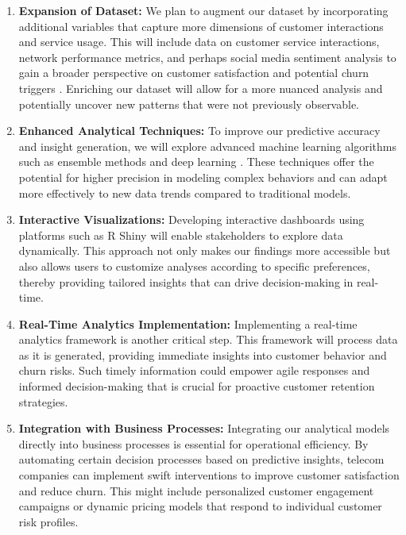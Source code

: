 \documentclass[12pt]{article}
\begin{document}
\begin{enumerate}
    \item \textbf{Expansion of Dataset:} We plan to augment our dataset by incorporating additional variables that capture more dimensions of customer interactions and service usage. This will include data on customer service interactions, network performance metrics, and perhaps social media sentiment analysis to gain a broader perspective on customer satisfaction and potential churn triggers \cite{han2011}. Enriching our dataset will allow for a more nuanced analysis and potentially uncover new patterns that were not previously observable.
    
    \item \textbf{Enhanced Analytical Techniques:} To improve our predictive accuracy and insight generation, we will explore advanced machine learning algorithms such as ensemble methods \cite{zhou2012} and deep learning \cite{goodfellow2016}. These techniques offer the potential for higher precision in modeling complex behaviors and can adapt more effectively to new data trends compared to traditional models.
    
    \item \textbf{Interactive Visualizations:} Developing interactive dashboards using platforms such as R Shiny \cite{chang2020} will enable stakeholders to explore data dynamically. This approach not only makes our findings more accessible but also allows users to customize analyses according to specific preferences, thereby providing tailored insights that can drive decision-making in real-time.
    
    \item \textbf{Real-Time Analytics Implementation:} Implementing a real-time analytics framework is another critical step. This framework will process data as it is generated, providing immediate insights into customer behavior and churn risks. Such timely information could empower agile responses and informed decision-making that is crucial for proactive customer retention strategies.
    
    \item \textbf{Integration with Business Processes:} Integrating our analytical models directly into business processes is essential for operational efficiency. By automating certain decision processes based on predictive insights, telecom companies can implement swift interventions to improve customer satisfaction and reduce churn. This might include personalized customer engagement campaigns or dynamic pricing models that respond to individual customer risk profiles.
\end{enumerate}
\end{document}
